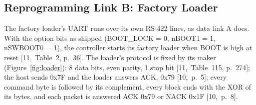 \documentclass[11pt,a4paper]{article}
\begin{document}
\subsection{Reprogramming Link B: Factory Loader}
\label{sec:loader}
The factory loader's UART runs over its own RS-422 lines, as data link A does.
With the option bits as shipped (BOOT\_LOCK = 0, nBOOT1 = 1, nSWBOOT0 = 1), the
controller starts its factory loader when BOOT is high at reset
[11,~Table~2, p.~36]. The loader's protocol is fixed by its maker
(Figure~\ref{fig:loader}): 8 data bits, even parity, 1 stop bit
[11,~Table~115, p.~274]; the host sends 0x7F and the loader answers ACK, 0x79
[10,~p.~5]; every command byte is followed by its complement, every block
ends with the XOR of its bytes, and each packet is answered ACK 0x79 or NACK
0x1F [10,~p.~8].
\end{document}
